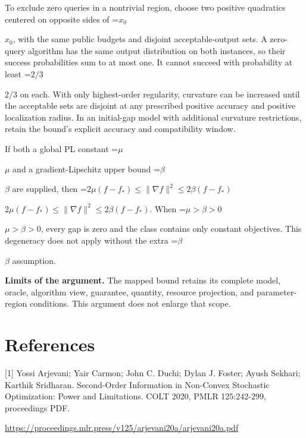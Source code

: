 \documentclass[10pt,a4paper]{article}
\newcommand{\AtlasMath}[1]{\par\begingroup\centering\setbox0=\hbox{$\displaystyle #1$}\ifdim\wd0>1.4\linewidth\typeout{ATLAS WIDE FORMULA: \the\wd0}\fi\ifdim\wd0>\linewidth\resizebox{\linewidth}{!}{\box0}\else\box0\fi\par\endgroup}
\newcommand{\AtlasInlineMath}[1]{\begingroup\setbox0=\hbox{$#1$}\ifdim\wd0>.4\linewidth\endgroup\AtlasMath{#1}\else\endgroup$#1$\fi}
\begin{document}
To exclude zero queries in a nontrivial region, choose two positive quadratics centered on opposite sides of \AtlasInlineMath{x_0}, with the same public budgets and disjoint acceptable-output sets. A zero-query algorithm has the same output distribution on both instances, so their success probabilities sum to at most one. It cannot succeed with probability at least \AtlasInlineMath{2/3} on each. With only highest-order regularity, curvature can be increased until the acceptable sets are disjoint at any prescribed positive accuracy and positive localization radius. In an initial-gap model with additional curvature restrictions, retain the bound's explicit accuracy and compatibility window.

If both a global PL constant \AtlasInlineMath{\mu} and a gradient-Lipschitz upper bound \AtlasInlineMath{\beta} are supplied, then \AtlasInlineMath{2\mu(f-f_*)\le\|\nabla f\|^2\le2\beta(f-f_*)}. When \AtlasInlineMath{\mu>\beta>0}, every gap is zero and the class contains only constant objectives. This degeneracy does not apply without the extra \AtlasInlineMath{\beta} assumption.

\textbf{Limits of the argument.} The mapped bound retains its complete model, oracle, algorithm view, guarantee, quantity, resource projection, and parameter-region conditions. This argument does not enlarge that scope.

\section{References}
[1] Yossi Arjevani; Yair Carmon; John C. Duchi; Dylan J. Foster; Ayush Sekhari; Karthik Sridharan. Second-Order Information in Non-Convex Stochastic Optimization: Power and Limitations. COLT 2020, PMLR 125:242-299, proceedings PDF.

\url{https://proceedings.mlr.press/v125/arjevani20a/arjevani20a.pdf}
\end{document}
